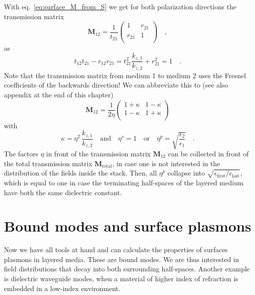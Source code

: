 With eq.~\ref{eq:surface_M_from_S} we get for both polarization directions the transmission matrix
\begin{equation}
\mathbf{M}_{12} = \frac{1}{t_{21}} 
\begin{pmatrix}
1 & r_{21} \\ r_{21} & 1 \\
\end{pmatrix} \quad ,
\end{equation}
as 
\begin{equation}
t_{12} t_{21} - r_{12}r_{21} = t_{21}^2 \frac{k_{z,1}}{k_{z,2}} + r_{21}^2 = 1 \quad . 
\end{equation}
Note that the transmission matrix from medium 1 to medium 2 uses the Fresnel coefficients of the backwards direction!
We can abbreviate this to (see also appendix at the end of this chapter)
\begin{equation}
\mathbf{M}_{12} 
=\frac{ 1}{2 \eta }
\begin{pmatrix}
1 + \kappa & 1  -\kappa \\  1  - \kappa  & 1 + \kappa \\
\end{pmatrix} \label{eq:surface_M_kappa}
\end{equation}
with 
\begin{equation}
\kappa = \eta^2 \,
\frac{  k_{z,1} }{ k_{z,2}}
\quad
\text{and}
\quad
\eta^s = 1 \quad \text{or} \quad \eta^p = \sqrt{ \frac{\epsilon_2}{\epsilon_1} } \quad . 
\end{equation}
The factors $\eta$ in front of the transmission matrix $\mathbf{M}_{12} $ can be collected in front of the total transmission matrix $\mathbf{M}_\text{total}$, in case one is not interested in the distribution of the fields inside the stack. Then, all $\eta^p$ collapse into $\sqrt{\epsilon_\text{first} / \epsilon_\text{last}}$, which is equal to one in case the terminating half-spaces of the layered medium have both the same dielectric constant. 



\section{Bound modes and surface plasmons}

Now we have all tools at hand and can calculate the properties of surfaces plasmons in layered media. These are bound modes. We are thus interested in field distributions that decay into both surrounding half-spaces. Another example is dielectric waveguide modes, when a material of higher index of refraction is embedded in a low-index environment.

